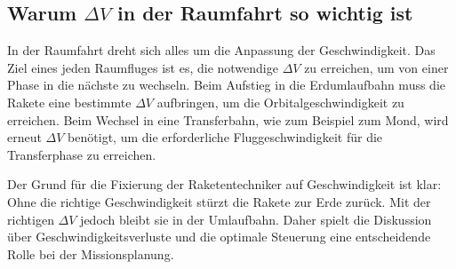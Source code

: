 \subsection{Warum \(\Delta V\) in der Raumfahrt so wichtig ist}
In der Raumfahrt dreht sich alles um die Anpassung der Geschwindigkeit. 
Das Ziel eines jeden Raumfluges ist es, die notwendige \(\Delta V\) zu erreichen, um von einer Phase in die nächste zu wechseln. 
Beim Aufstieg in die Erdumlaufbahn muss die Rakete eine bestimmte \(\Delta V\) aufbringen, um die Orbitalgeschwindigkeit zu erreichen. 
Beim Wechsel in eine Transferbahn, wie zum Beispiel zum Mond, wird erneut \(\Delta V\) benötigt, um die erforderliche Fluggeschwindigkeit für die Transferphase zu erreichen.

Der Grund für die Fixierung der Raketentechniker auf Geschwindigkeit ist klar: Ohne die richtige Geschwindigkeit stürzt die Rakete zur Erde zurück. 
Mit der richtigen \(\Delta V\) jedoch bleibt sie in der Umlaufbahn. Daher spielt die Diskussion über Geschwindigkeitsverluste und die optimale Steuerung eine entscheidende Rolle bei der Missionsplanung.

